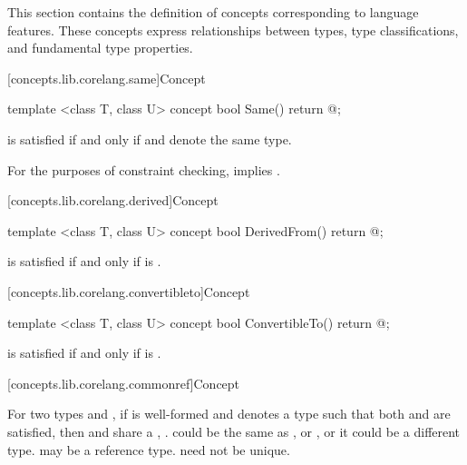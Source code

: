 \begin{addedblock}
\pnum
This section contains the definition of concepts corresponding to language features.
These concepts express relationships between types, type classifications, and
fundamental type properties.

[concepts.lib.corelang.same]{Concept }

%
\begin{itemdecl}
template <class T, class U>
concept bool Same() {
  return @\seebelow@;
}
\end{itemdecl}

\begin{itemdescr}
\pnum
{} is satisfied if and
only if  and  denote the same type.

\pnum
\remarks For the purposes of constraint checking,  implies
.
\end{itemdescr}

[concepts.lib.corelang.derived]{Concept }

%
\begin{itemdecl}
template <class T, class U>
concept bool DerivedFrom() {
  return @\seebelow@;
}
\end{itemdecl}

\begin{itemdescr}
\pnum
{} is satisfied if and only if
 is .
\end{itemdescr}

[concepts.lib.corelang.convertibleto]{Concept }

%
\begin{itemdecl}
template <class T, class U>
concept bool ConvertibleTo() {
  return @\seebelow@;
}
\end{itemdecl}

\begin{itemdescr}
\pnum
{} is satisfied
if and only if  is .
\end{itemdescr}

{\color{newclr}
[concepts.lib.corelang.commonref]{Concept }

\pnum
For two types  and , if 
is well-formed and denotes a type  such that both
 and  are
satisfied, then  and  share a , . \enternote {} could be the same as , or
, or it could be a different type.  may be a reference
type.  need not be unique.\exitnote

}
\end{addedblock}
